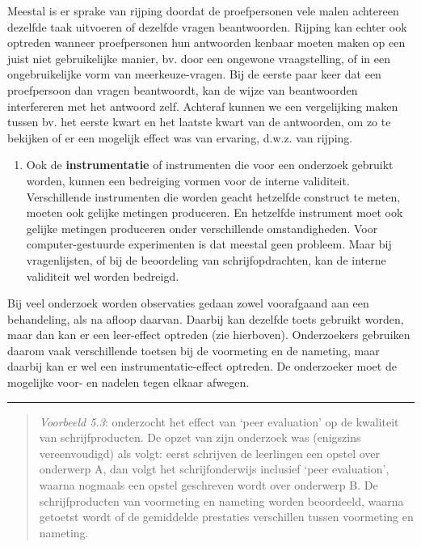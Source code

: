 \documentclass[
]{book}
\providecommand{\tightlist}{%
  \setlength{\itemsep}{0pt}\setlength{\parskip}{0pt}}
\begin{document}
Meestal is er sprake van rijping doordat de proefpersonen vele malen
achtereen dezelfde taak uitvoeren of dezelfde vragen beantwoorden.
Rijping kan echter ook optreden wanneer proefpersonen hun antwoorden
kenbaar moeten maken op een juist niet gebruikelijke manier, bv. door
een ongewone vraagstelling, of in een ongebruikelijke vorm van
meerkeuze-vragen. Bij de eerste paar keer dat een proefpersoon dan
vragen beantwoordt, kan de wijze van beantwoorden interfereren met het
antwoord zelf. Achteraf kunnen we een vergelijking maken tussen bv. het
eerste kwart en het laatste kwart van de antwoorden, om zo te bekijken
of er een mogelijk effect was van ervaring, d.w.z. van rijping.

\begin{enumerate}
\def\labelenumi{\arabic{enumi}.}
\setcounter{enumi}{2}
\tightlist
\item
  Ook de \textbf{instrumentatie} of instrumenten die voor een onderzoek
  gebruikt worden, kunnen een bedreiging vormen voor de interne
  validiteit. Verschillende instrumenten die worden geacht hetzelfde
  construct te meten, moeten ook gelijke metingen produceren. En hetzelfde
  instrument moet ook gelijke metingen produceren onder verschillende
  omstandigheden. Voor computer-gestuurde experimenten is dat meestal geen
  probleem. Maar bij vragenlijsten, of bij de beoordeling van
  schrijfopdrachten, kan de interne validiteit wel worden bedreigd.
\end{enumerate}

Bij veel onderzoek worden observaties gedaan zowel voorafgaand aan een
behandeling, als na afloop daarvan. Daarbij kan dezelfde toets gebruikt
worden, maar dan kan er een leer-effect optreden (zie hierboven).
Onderzoekers gebruiken daarom vaak verschillende toetsen bij de
voormeting en de nameting, maar daarbij kan er wel een
instrumentatie-effect optreden. De onderzoeker moet de mogelijke voor-
en nadelen tegen elkaar afwegen.

\begin{center}\rule{0.5\linewidth}{0.5pt}\end{center}

\begin{quote}
\emph{Voorbeeld 5.3}: \citet{Rijl86}
onderzocht het effect van `peer evaluation' op de kwaliteit van
schrijfproducten. De opzet van zijn onderzoek was (enigszins
vereenvoudigd) als volgt: eerst schrijven de leerlingen een opstel over
onderwerp A, dan volgt het schrijfonderwijs inclusief `peer evaluation',
waarna nogmaals een opstel geschreven wordt over onderwerp B. De
schrijfproducten van voormeting en nameting worden beoordeeld, waarna
getoetst wordt of de gemiddelde prestaties verschillen tussen voormeting
en nameting.
\end{quote}
\end{document}
